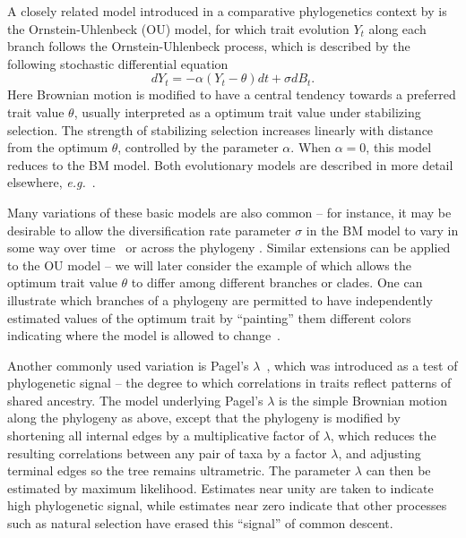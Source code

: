 A closely related model introduced in a comparative phylogenetics context by \citet{Hansen1997} 
is the Ornstein-Uhlenbeck (OU) model, for which 
trait evolution $Y_t$ along each branch follows the Ornstein-Uhlenbeck process, 
which is described by the following stochastic differential equation
\begin{equation}
dY_t = - \alpha (Y_t - \theta)dt + \sigma d B_t .
\label{ou}
\end{equation}
Here Brownian motion is modified to have a central tendency towards a preferred trait value $\theta$, 
usually interpreted as a optimum trait value under stabilizing selection.  
The strength of stabilizing selection increases linearly with distance from the optimum $\theta$, 
controlled by the parameter $\alpha$.  
When $\alpha = 0$, this model reduces to the BM model.  
Both evolutionary models are described in more detail elsewhere, \emph{e.g.}~\citet{Butler2004}.

Many variations of these basic models are also common -- for instance, it may be desirable to allow the diversification rate parameter $\sigma$ in the BM model to vary in some way over time~\citep{Blomberg2003, Harmon2010, Pagel1999} or across the phylogeny \citep{O'Meara2006}.  
Similar extensions can be applied to the OU model -- we will later consider the example of \citet{Butler2004} which allows the optimum trait value $\theta$ to differ among different branches or clades.
One can illustrate which branches of a phylogeny are permitted to have independently estimated values of the optimum trait by ``painting'' them different colors indicating where the model is allowed to change~\citep{Butler2004}.  

Another commonly used variation is Pagel's $\lambda$~\citep{Pagel1994, Freckleton2002}, 
which was introduced as a test of phylogenetic signal
-- the degree to which correlations in traits reflect patterns of shared ancestry.  
The model underlying Pagel's $\lambda$ is the simple Brownian motion along the phylogeny as above,
except that the phylogeny is modified by shortening all internal edges by a multiplicative factor of $\lambda$,
which reduces the resulting correlations between any pair of taxa by a factor $\lambda$, 
and adjusting terminal edges so the tree remains ultrametric.
The parameter $\lambda$ can then be estimated by maximum likelihood.
Estimates near unity are taken to indicate high phylogenetic signal,
while estimates near zero 
indicate that other processes such as natural selection have erased this ``signal'' of common descent.



